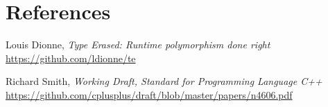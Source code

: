 \documentclass{wg21}
\begin{document}
\section{References}
\renewcommand{\section}[2]{}%
\begin{thebibliography}{9}

    Louis Dionne,
    \emph{Type Erased: Runtime polymorphism done right}\newline
    \url{https://github.com/ldionne/te}

    Richard Smith,
    \emph{Working Draft, Standard for Programming Language C++}\newline
    \url{https://github.com/cplusplus/draft/blob/master/papers/n4606.pdf}

\end{thebibliography}
\end{document}
